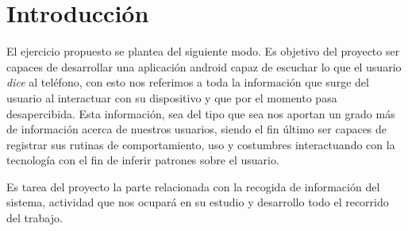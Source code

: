 \documentclass[12pt,a4paper,oneside]{book} %
\begin{document}


\pagestyle{fancy}
\setcounter{page}{1}

\chapter{Introducción}
El ejercicio propuesto se plantea del siguiente modo. Es objetivo del proyecto ser capaces de desarrollar una aplicación android capaz de escuchar lo que el usuario \textit{dice} al teléfono, con esto nos referimos a toda la información que surge del usuario al interactuar con su dispositivo y que por el momento pasa desapercibida. Esta información, sea del tipo que sea nos aportan un grado más de información acerca de nuestros usuarios, siendo el fin último ser capaces de registrar sus rutinas de comportamiento, uso y costumbres interactuando con la tecnología con el fin de inferir patrones sobre el usuario. 

Es tarea del proyecto la parte relacionada con la recogida de información del sistema, actividad que nos ocupará en su estudio y desarrollo todo el recorrido del trabajo. 
\end{document}
